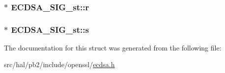 \subsubsection[{\texorpdfstring{r}{r}}]{$\ast$ E\+C\+D\+S\+A\+\_\+\+S\+I\+G\+\_\+st\+::r}\hypertarget{struct_e_c_d_s_a___s_i_g__st_aa4a144f7356b7e62243af763e584fd0f}{}\label{struct_e_c_d_s_a___s_i_g__st_aa4a144f7356b7e62243af763e584fd0f}
\subsubsection[{\texorpdfstring{s}{s}}]{$\ast$ E\+C\+D\+S\+A\+\_\+\+S\+I\+G\+\_\+st\+::s}\hypertarget{struct_e_c_d_s_a___s_i_g__st_a784f9869eb36cd84ea750b3ac58075ca}{}\label{struct_e_c_d_s_a___s_i_g__st_a784f9869eb36cd84ea750b3ac58075ca}


The documentation for this struct was generated from the following file\+:\begin{DoxyCompactItemize}
\item 
src/hal/pb2/include/openssl/\hyperlink{ecdsa_8h}{ecdsa.\+h}\end{DoxyCompactItemize}
